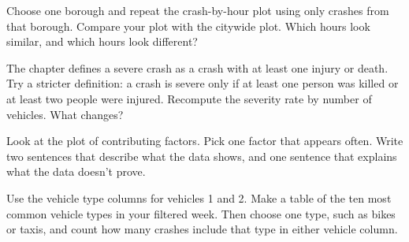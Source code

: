 \begin{exercise}
Choose one borough and repeat the crash-by-hour plot using only crashes
from that borough. Compare your plot with the citywide plot. Which
hours look similar, and which hours look different?
\end{exercise}

\begin{exercise}
The chapter defines a severe crash as a crash with at least one injury
or death. Try a stricter definition: a crash is severe only if at least
one person was killed or at least two people were injured. Recompute
the severity rate by number of vehicles. What changes?
\end{exercise}

\begin{exercise}
Look at the plot of contributing factors. Pick one factor that appears
often. Write two sentences that describe what the data shows, and one
sentence that explains what the data doesn't prove.
\end{exercise}

\begin{exercise}
Use the vehicle type columns for vehicles 1 and 2. Make a table of the
ten most common vehicle types in your filtered week. Then choose one
type, such as bikes or taxis, and count how many crashes include that
type in either vehicle column.
\end{exercise}




